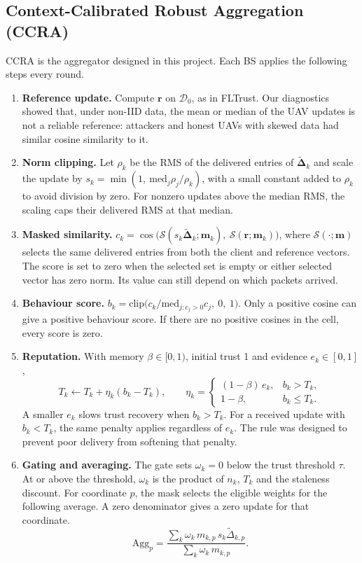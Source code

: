 \subsection{Context-Calibrated Robust Aggregation (CCRA)}
CCRA is the aggregator designed in this project. Each BS applies the following
steps every round.
\begin{enumerate}
\item \textbf{Reference update.} Compute $\mathbf{r}$ on $\mathcal{D}_0$, as in FLTrust.
  Our diagnostics showed that, under non-IID data, the mean or median of the UAV
  updates is not a reliable reference: attackers and honest UAVs with skewed data
  had similar cosine similarity to it.
\item \textbf{Norm clipping.} Let $\rho_k$ be the RMS of the delivered entries of
  $\tilde{\boldsymbol\Delta}_k$ and scale the update by
  $s_k=\min(1,\ \mathrm{med}_j\rho_j/\rho_k)$, with a small constant added to
  $\rho_k$ to avoid division by zero. For nonzero updates above the median RMS,
  the scaling caps their delivered RMS at that median.
\item \textbf{Masked similarity.}
  $c_k=\cos\bigl(\mathcal{S}(s_k\tilde{\boldsymbol\Delta}_k;\mathbf{m}_k),\
  \mathcal{S}(\mathbf{r};\mathbf{m}_k)\bigr)$, where $\mathcal{S}(\cdot;\mathbf{m})$
  selects the same delivered entries from both the client and reference vectors.
  The score is set to zero when the selected set is empty or either selected
  vector has zero norm. Its value can still depend on which packets arrived.
\item \textbf{Behaviour score.} $b_k=\mathrm{clip}\bigl(c_k/\mathrm{med}_{j:c_j>0}c_j,\
  0,\ 1\bigr)$. Only a positive cosine can give a positive behaviour score.
  If there are no positive cosines in the cell, every score is zero.
\item \textbf{Reputation.} With memory $\beta\in[0,1)$, initial trust 1 and evidence
  $e_k\in[0,1]$,
  \begin{equation}
    T_k \leftarrow T_k+\eta_k(b_k-T_k),\qquad
    \eta_k=\begin{cases}(1-\beta)\,e_k, & b_k>T_k,\\ 1-\beta, & b_k\le T_k.\end{cases}
    \label{eq:reputation}
  \end{equation}
  A smaller $e_k$ slows trust recovery when $b_k>T_k$. For a received update
  with $b_k<T_k$, the same penalty applies regardless of $e_k$. The rule was
  designed to prevent poor delivery from softening that penalty.
\item \textbf{Gating and averaging.} The gate sets $\omega_k=0$ below the trust
  threshold $\tau$. At or above the threshold, $\omega_k$ is the product of
  $n_k$, $T_k$ and the staleness discount. For coordinate $p$, the mask selects
  the eligible weights for the following average. A zero denominator gives a
  zero update for that coordinate.
  \begin{equation}
    \mathrm{Agg}_p=\frac{\sum_k\omega_k\,m_{k,p}\,s_k\tilde\Delta_{k,p}}
                      {\sum_k\omega_k\,m_{k,p}}.
    \label{eq:masked-average}
  \end{equation}
\end{enumerate}
